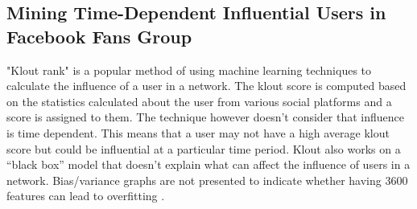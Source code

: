 \subsection{Mining Time-Dependent Influential Users in Facebook Fans Group}
"Klout rank" is a popular method of using machine learning techniques to calculate the influence of a user in a network. The klout score is computed based on the statistics calculated about the user from various social platforms and a score is assigned to them. The technique however doesn’t consider that influence is time dependent. This means that a user may not have a high average klout score but could be influential at a particular time period. Klout also works on a “black box” model that doesn’t explain what can affect the influence of users in a network. Bias/variance graphs are not presented to indicate whether having 3600 features can lead to overfitting \cite{aps:23} \cite{aps:22}.


%
%



